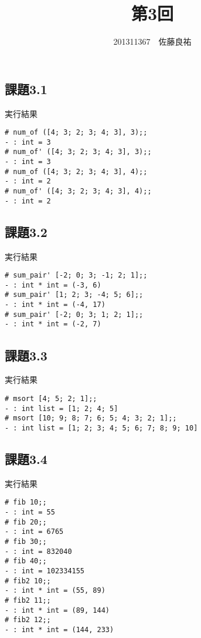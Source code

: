 \documentclass[11pt,a4j]{jarticle}
\title{第3回}
\author{201311367　佐藤良祐}
\begin{document}
\subsection*{課題3.1}

実行結果
\begin{lstlisting}
# num_of ([4; 3; 2; 3; 4; 3], 3);;
- : int = 3
# num_of' ([4; 3; 2; 3; 4; 3], 3);;
- : int = 3
# num_of ([4; 3; 2; 3; 4; 3], 4);;
- : int = 2
# num_of' ([4; 3; 2; 3; 4; 3], 4);;
- : int = 2
\end{lstlisting}
\subsection*{課題3.2}

実行結果
\begin{lstlisting}
# sum_pair' [-2; 0; 3; -1; 2; 1];;
- : int * int = (-3, 6)
# sum_pair' [1; 2; 3; -4; 5; 6];;
- : int * int = (-4, 17)
# sum_pair' [-2; 0; 3; 1; 2; 1];;
- : int * int = (-2, 7)
\end{lstlisting}
\newpage
\subsection*{課題3.3}

実行結果
\begin{lstlisting}
# msort [4; 5; 2; 1];;
- : int list = [1; 2; 4; 5]
# msort [10; 9; 8; 7; 6; 5; 4; 3; 2; 1];;
- : int list = [1; 2; 3; 4; 5; 6; 7; 8; 9; 10] 
\end{lstlisting}
\newpage

\subsection*{課題3.4}

実行結果
\begin{lstlisting}
# fib 10;;
- : int = 55
# fib 20;;
- : int = 6765
# fib 30;;
- : int = 832040
# fib 40;;
- : int = 102334155
# fib2 10;;
- : int * int = (55, 89)
# fib2 11;;
- : int * int = (89, 144)
# fib2 12;;
- : int * int = (144, 233)
\end{lstlisting}
\end{document}

